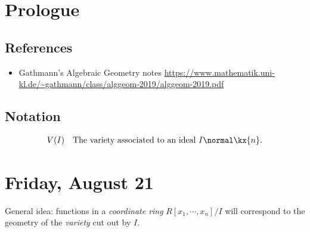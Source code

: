 \newpage

\tableofcontents
\newpage

\hypertarget{prologue}{%
\section*{Prologue}\label{prologue}}

\hypertarget{references}{%
\subsection{References}\label{references}}

\begin{itemize}
\tightlist
\item
  Gathmann's Algebraic Geometry notes\autocite{AndreasGathmann515}
  \url{https://www.mathematik.uni-kl.de/~gathmann/class/alggeom-2019/alggeom-2019.pdf}
\end{itemize}

\hypertarget{notation}{%
\subsection{Notation}\label{notation}}

\begin{align*}  
V(I) && \text{The variety associated to an ideal } I \normal \kx{n}
.\end{align*}


\newpage

\hypertarget{friday-august-21}{%
\section{Friday, August 21}\label{friday-august-21}}

General idea: functions in a \emph{coordinate ring}
\(R[x_1, \cdots, x_n]/I\) will correspond to the geometry of the
\emph{variety} cut out by \(I\).

